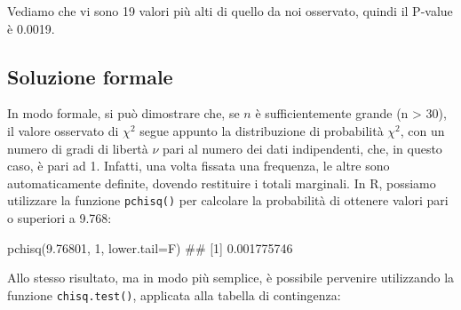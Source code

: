 \documentclass[a4paper,12pt,oneside]{book}
\newenvironment{Shaded}{\begin{snugshade}}{\end{snugshade}}
\newcommand{\DecValTok}[1]{#1}
\newcommand{\FloatTok}[1]{#1}
\newcommand{\SpecialCharTok}[1]{#1}
\newcommand{\DocumentationTok}[1]{#1}
\newcommand{\OtherTok}[1]{#1}
\newcommand{\FunctionTok}[1]{#1}
\newcommand{\ControlFlowTok}[1]{#1}
\newcommand{\AttributeTok}[1]{#1}
\newcommand{\NormalTok}[1]{#1}
\begin{document}
\begin{Shaded}
\end{Shaded}

Vediamo che vi sono 19 valori più alti di quello da noi osservato, quindi il P-value è 0.0019.

\hypertarget{soluzione-formale-1}{%
\subsection{Soluzione formale}\label{soluzione-formale-1}}

In modo formale, si può dimostrare che, se \(n\) è sufficientemente grande (n \textgreater{} 30), il valore osservato di \(\chi^2\) segue appunto la distribuzione di probabilità \(\chi^2\), con un numero di gradi di libertà \(\nu\) pari al numero dei dati indipendenti, che, in questo caso, è pari ad 1. Infatti, una volta fissata una frequenza, le altre sono automaticamente definite, dovendo restituire i totali marginali. In R, possiamo utilizzare la funzione \texttt{pchisq()} per calcolare la probabilità di ottenere valori pari o superiori a 9.768:

\begin{Shaded}
\begin{Highlighting}[]
\FunctionTok{pchisq}\NormalTok{(}\FloatTok{9.76801}\NormalTok{, }\DecValTok{1}\NormalTok{, }\AttributeTok{lower.tail=}\NormalTok{F)}
\DocumentationTok{\#\# [1] 0.001775746}
\end{Highlighting}
\end{Shaded}

Allo stesso risultato, ma in modo più semplice, è possibile pervenire utilizzando la funzione \texttt{chisq.test()}, applicata alla tabella di contingenza:
\end{document}
